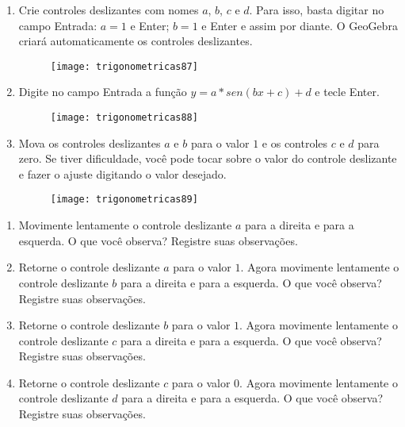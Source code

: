 \documentclass[10 pt,usenames,dvipsnames, oneside]{article}
\begin{document}
\begin{enumerate}[label=\titem{\arabic*.}, left=0pt]
\item Crie controles deslizantes com nomes $a$, $b$, $c$ e $d$. Para isso, basta digitar no campo Entrada: $a=1$ e Enter; $b=1$ e Enter e assim por diante. O GeoGebra criará automaticamente os controles deslizantes.
  \begin{figure}[H]
  \centering
  
  \texttt{[image: trigonometricas87]}
  \end{figure}

\newpage
\item Digite no campo Entrada a função $y = a*sen(bx+c)+d$ e tecle Enter.
\begin{figure}[H]
  \centering
  
  \texttt{[image: trigonometricas88]}
  \end{figure}
 
\item Mova os controles deslizantes $a$ e $b$ para o valor $1$ e os controles $c$ e $d$ para zero. Se tiver dificuldade, você pode tocar sobre o valor do controle deslizante e fazer o ajuste digitando o valor desejado.
\begin{figure}[H]
  \centering
  
  \texttt{[image: trigonometricas89]}
  \end{figure}

\end{enumerate}
 
 \ifdefined\prof
 \clearpage
 \else
 \fi
\begin{enumerate}
\item Movimente lentamente o controle deslizante $a$ para a direita e para a esquerda. O que você observa? Registre suas observações. 
\item Retorne o controle deslizante $a$ para o valor $1$. Agora movimente lentamente o controle deslizante $b$ para a direita e para a esquerda. O que você observa? Registre suas observações.
\item Retorne o controle deslizante $b$ para o valor $1$. Agora movimente lentamente o controle deslizante $c$ para a direita e para a esquerda. O que você observa? Registre suas observações.
\item Retorne o controle deslizante $c$ para o valor $0$. Agora movimente lentamente o controle deslizante $d$ para a direita e para a esquerda. O que você observa? Registre suas observações.
\end{enumerate}
\end{document}
